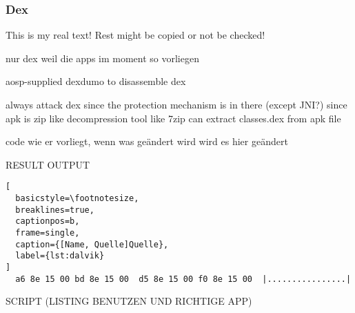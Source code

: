 \subsubsection{Dex} \label{subsubsection:tools-dex}
This is my real text! Rest might be copied or not be checked!


%
nur dex weil die apps im moment so vorliegen

aosp-supplied dexdumo to disassemble dex

\cite{andevconDalvikART}
%
%
always attack dex since the protection mechanism is in there (except JNI?)
since apk is zip like decompression tool like 7zip can extract classes.dex from apk file




code wie er vorliegt, wenn was geändert wird wird es hier geändert

RESULT OUTPUT

\begin{lstlisting}[
  basicstyle=\footnotesize,
  breaklines=true,
  captionpos=b,
  frame=single,
  caption={[Name, Quelle]Quelle},
  label={lst:dalvik}
]
  a6 8e 15 00 bd 8e 15 00  d5 8e 15 00 f0 8e 15 00  |................|
\end{lstlisting}

SCRIPT (LISTING BENUTZEN UND RICHTIGE APP)



